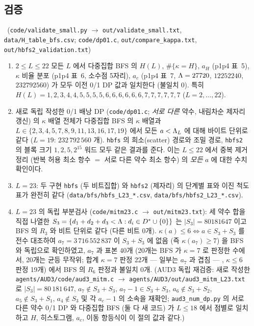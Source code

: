 \subsection{검증}\label{NUM:ssec-valid}

\begin{proposition}[교차검증]\label{NUM:prop-valid}
\NUMERIC\ (\texttt{code/validate\_small.py} $\to$ \texttt{out/validate\_small.txt}, \texttt{data/H\_table\_bfs.csv};
\texttt{code/dp01.c}, \texttt{out/compare\_kappa.txt}, \texttt{out/hbfs2\_validation.txt})
\begin{enumerate}[label=(\arabic*)]
\item $2\le L\le 22$ 모든 $L$ 에서 다중집합 BFS 의 $H(L)$, $\#\{\kappa=H\}$, $a_H$ (p1p4 표~5), $\kappa$ 비율 분포 (p1p4 표~6, 소수점 5자리),
$a_c$ (p1p4 표~7, $\Lambda=27720$, $12252240$, $232792560$) 가 모두 이전 0/1 DP 값과 일치한다 (불일치 0).
특히 $H(L)=1,2,3,4,4,5,5,5,5,6,6,6,6,6,6,7,7,7,7,7,7$ ($L=2,\dots,22$).
\item 새로 독립 작성한 0/1 배낭 DP (\texttt{code/dp01.c}; \emph{서로 다른} 약수, 내림차순 제자리 갱신) 의 $\kappa$ 배열 전체가
다중집합 BFS 의 $\kappa$ 배열과 $L\in\{2,3,4,5,7,8,9,11,13,16,17,19\}$ 에서 모든 $a<\Lambda_L$ 에 대해 바이트 단위로 같다
($L=19$: $232\,792\,560$ 개). \texttt{hbfs} 의 희소(scatter) 경로와 조밀 경로, \texttt{hbfs2} 의 블록 크기 $1,2,5,2^{15}$ 워드 모두 같은 결과를 준다.
이는 $L\le 22$ 에서 중복 제거 정리 (반복 허용 최소 항수 $=$ 서로 다른 약수 최소 항수) 의 \emph{모든} $a$ 에 대한 수치 확인이다.
\item $L=23$: 두 구현 \texttt{hbfs} (두 비트집합) 와 \texttt{hbfs2} (제자리) 의 단계별 표와 이진 척도 표가 완전히 같다
(\texttt{data/bfs/hbfs\_L23\_*.csv}, \texttt{data/bfs/hbfs2\_L23\_*.csv}).
\item $L=23$ 의 독립 부분검사 (\texttt{code/mitm23.c} $\to$ \texttt{out/mitm23.txt}):
세 약수 합을 직접 나열한 $S_3=\{d_1+d_2+d_3<\Lambda: d_i\in D^*\cup\{0\}\}$ 는 $|S_3|=80181647$ 이고 BFS 의 $R_3$ 와 비트 단위로 같다 (다른 비트 0개). $\kappa(a)\le6\iff a\in S_3+S_3$ 를 전수 대조하여 $a_7=3\,716\,552\,837$ 이 $S_3+S_3$ 에 없음 (즉 $\kappa(a_7)\ge7$) 을 BFS 와 독립으로 확인하였고, $a_7$ 과 표본 40개 (20개는 BFS 가 $\kappa=7$ 로 판정한 수에서, 20개는 균등 무작위; 합계 $\kappa=7$ 판정 22개 --- 일부는 $a_7$ 과 겹침 --- , $\kappa\le6$ 판정 19개) 에서 BFS 의 $R_6$ 판정과 불일치 0개.
(AUD3 독립 재검증: 새로 작성한 \texttt{agents/AUD3/code/aud3\_mitm.c} $\to$ \texttt{agents/AUD3/out/aud3\_mitm\_L23.txt} 로 $|S_3|=80\,181\,647$,
$a_7\notin S_3+S_3$, $a_7-1\in S_3+S_3$, $a_6\notin S_3+S_2$, $a_5\notin S_3+S_1$, $a_4\notin S_3$ 및 각 $a_c-1$ 의 소속을 재확인;
\texttt{aud3\_num\_dp.py} 의 서로 다른 약수 0/1 DP 와 다중집합 BFS (둘 다 새 코드) 가 $L\le18$ 에서 점별로 일치하고 $H$, 히스토그램, $a_c$, 이동 항등식이 이 절의 값과 같다.)
\end{enumerate}
\end{proposition}


